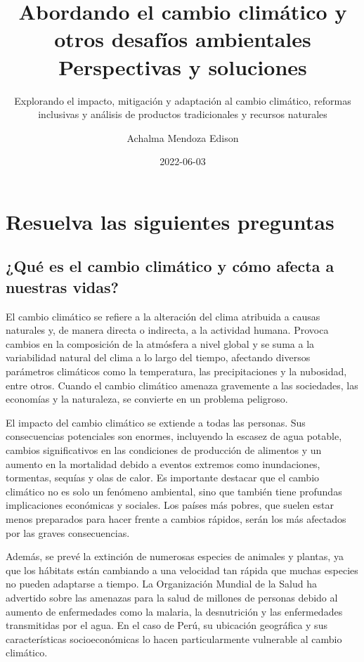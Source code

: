 \documentclass[
  letterpaper,
  DIV=11,
  numbers=noendperiod]{scrartcl}
\title{Abordando el cambio climático y otros desafíos ambientales
Perspectivas y soluciones}
\subtitle{Explorando el impacto, mitigación y adaptación al cambio
climático, reformas inclusivas y análisis de productos tradicionales y
recursos naturales}
\author{Achalma Mendoza Edison}
\date{2022-06-03}
\begin{document}
\maketitle
\ifdefined\Shaded\renewenvironment{Shaded}{\begin{tcolorbox}[borderline west={3pt}{0pt}{shadecolor}, boxrule=0pt, interior hidden, frame hidden, enhanced, sharp corners, breakable]}{\end{tcolorbox}}\fi

\hypertarget{resuelva-las-siguientes-preguntas}{%
\section{Resuelva las siguientes
preguntas}\label{resuelva-las-siguientes-preguntas}}

\hypertarget{quuxe9-es-el-cambio-climuxe1tico-y-cuxf3mo-afecta-a-nuestras-vidas}{%
\subsection{¿Qué es el cambio climático y cómo afecta a nuestras
vidas?}\label{quuxe9-es-el-cambio-climuxe1tico-y-cuxf3mo-afecta-a-nuestras-vidas}}

El cambio climático se refiere a la alteración del clima atribuida a
causas naturales y, de manera directa o indirecta, a la actividad
humana. Provoca cambios en la composición de la atmósfera a nivel global
y se suma a la variabilidad natural del clima a lo largo del tiempo,
afectando diversos parámetros climáticos como la temperatura, las
precipitaciones y la nubosidad, entre otros. Cuando el cambio climático
amenaza gravemente a las sociedades, las economías y la naturaleza, se
convierte en un problema peligroso.

El impacto del cambio climático se extiende a todas las personas. Sus
consecuencias potenciales son enormes, incluyendo la escasez de agua
potable, cambios significativos en las condiciones de producción de
alimentos y un aumento en la mortalidad debido a eventos extremos como
inundaciones, tormentas, sequías y olas de calor. Es importante destacar
que el cambio climático no es solo un fenómeno ambiental, sino que
también tiene profundas implicaciones económicas y sociales. Los países
más pobres, que suelen estar menos preparados para hacer frente a
cambios rápidos, serán los más afectados por las graves consecuencias.

Además, se prevé la extinción de numerosas especies de animales y
plantas, ya que los hábitats están cambiando a una velocidad tan rápida
que muchas especies no pueden adaptarse a tiempo. La Organización
Mundial de la Salud ha advertido sobre las amenazas para la salud de
millones de personas debido al aumento de enfermedades como la malaria,
la desnutrición y las enfermedades transmitidas por el agua. En el caso
de Perú, su ubicación geográfica y sus características socioeconómicas
lo hacen particularmente vulnerable al cambio climático.
\end{document}
